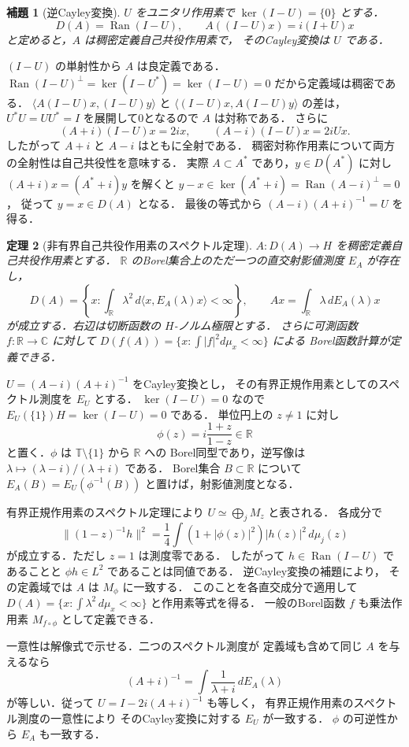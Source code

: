 \documentclass[a5paper,10pt,onecolumn]{jsarticle}
\makeatletter
\theoremstyle{mathnotetheorem}
\newtheorem{theorem}{定理}[section]
\newtheorem{lemma}[theorem]{補題}
\renewcommand{\proofname}{証明}
\renewenvironment{proof}[1][\proofname]{%
  \par\pushQED{\qed}\normalfont\topsep4\p@\@plus2\p@\relax
  \trivlist\item[\hskip\labelsep\bfseries #1]\ignorespaces
}{\popQED\endtrivlist\@endpefalse}
\newcommand{\norm}[1]{\lVert #1\rVert}
\makeatother
\begin{document}
\begin{lemma}[逆Cayley変換]
$U$ をユニタリ作用素で $\ker(I-U)=\{0\}$ とする．
\[
 D(A)=\operatorname{Ran}(I-U),\qquad
 A((I-U)x)=i(I+U)x
\]
と定めると，$A$ は稠密定義自己共役作用素で，
そのCayley変換は $U$ である．
\end{lemma}
\begin{proof}
$(I-U)$ の単射性から $A$ は良定義である．
$\operatorname{Ran}(I-U)^\perp=\ker(I-U^*)=\ker(I-U)=0$
だから定義域は稠密である．
$\langle A(I-U)x,(I-U)y\rangle$ と
$\langle (I-U)x,A(I-U)y\rangle$ の差は，
$U^*U=UU^*=I$ を展開して0となるので $A$ は対称である．
さらに
\[
 (A+i)(I-U)x=2ix,\qquad
 (A-i)(I-U)x=2iUx.
\]
したがって $A+i$ と $A-i$ はともに全射である．
稠密対称作用素について両方の全射性は自己共役性を意味する．
実際 $A\subset A^*$ であり，$y\in D(A^*)$ に対し
$(A+i)x=(A^*+i)y$ を解くと
$y-x\in\ker(A^*+i)=\operatorname{Ran}(A-i)^\perp=0$，
従って $y=x\in D(A)$ となる．
最後の等式から $(A-i)(A+i)^{-1}=U$ を得る．
\end{proof}

\begin{theorem}[非有界自己共役作用素のスペクトル定理]
$A:D(A)\to H$ を稠密定義自己共役作用素とする．
$\mathbb R$ のBorel集合上のただ一つの直交射影値測度 $E_A$ が存在し，
\[
 D(A)=\left\{x:\int_{\mathbb R}\lambda^2
                 \,d\langle x,E_A(\lambda)x\rangle<\infty\right\},
 \qquad Ax=\int_{\mathbb R}\lambda\,dE_A(\lambda)x
\]
が成立する．右辺は切断函数の $H$-ノルム極限とする．
さらに可測函数 $f:\mathbb R\to\mathbb C$ に対して
$D(f(A))=\{x:\int|f|^2d\mu_x<\infty\}$ による
Borel函数計算が定義できる．
\end{theorem}
\begin{proof}
$U=(A-i)(A+i)^{-1}$ をCayley変換とし，
その有界正規作用素としてのスペクトル測度を $E_U$ とする．
$\ker(I-U)=0$ なので
$E_U(\{1\})H=\ker(I-U)=0$ である．
単位円上の $z\ne1$ に対し
\[
 \phi(z)=i\frac{1+z}{1-z}\in\mathbb R
\]
と置く．$\phi$ は $\mathbb T\setminus\{1\}$ から $\mathbb R$ への
Borel同型であり，逆写像は
$\lambda\mapsto(\lambda-i)/(\lambda+i)$ である．
Borel集合 $B\subset\mathbb R$ について
$E_A(B)=E_U(\phi^{-1}(B))$ と置けば，射影値測度となる．

有界正規作用素のスペクトル定理により
$U\simeq\bigoplus_j M_z$ と表される．
各成分で
\[
 \norm{(1-z)^{-1}h}^2
   =\frac14\int(1+|\phi(z)|^2)|h(z)|^2\,d\mu_j(z)
\]
が成立する．ただし $z=1$ は測度零である．
したがって $h\in\operatorname{Ran}(I-U)$ であることと
$\phi h\in L^2$ であることは同値である．
逆Cayley変換の補題により，
その定義域では $A$ は $M_\phi$ に一致する．
このことを各直交成分で適用して
$D(A)=\{x:\int\lambda^2\,d\mu_x<\infty\}$ と作用素等式を得る．
一般のBorel函数 $f$ も乗法作用素 $M_{f\circ\phi}$ として定義できる．

一意性は解像式で示せる．二つのスペクトル測度が
定義域も含めて同じ $A$ を与えるなら
\[
 (A+i)^{-1}=\int\frac1{\lambda+i}\,dE_A(\lambda)
\]
が等しい．従って $U=I-2i(A+i)^{-1}$ も等しく，
有界正規作用素のスペクトル測度の一意性により
そのCayley変換に対する $E_U$ が一致する．
$\phi$ の可逆性から $E_A$ も一致する．
\end{proof}
\end{document}
